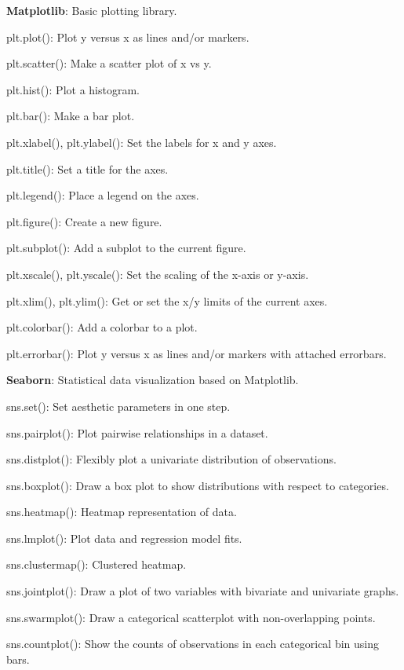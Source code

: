 \begin{DoxyItemize}
\item {\bfseries Matplotlib}\+: Basic plotting library.
\begin{DoxyItemize}
\item {\ttfamily plt.\+plot()}\+: Plot y versus x as lines and/or markers.
\item {\ttfamily plt.\+scatter()}\+: Make a scatter plot of x vs y.
\item {\ttfamily plt.\+hist()}\+: Plot a histogram.
\item {\ttfamily plt.\+bar()}\+: Make a bar plot.
\item {\ttfamily plt.\+xlabel()}, {\ttfamily plt.\+ylabel()}\+: Set the labels for x and y axes.
\item {\ttfamily plt.\+title()}\+: Set a title for the axes.
\item {\ttfamily plt.\+legend()}\+: Place a legend on the axes.
\item {\ttfamily plt.\+figure()}\+: Create a new figure.
\item {\ttfamily plt.\+subplot()}\+: Add a subplot to the current figure.
\item {\ttfamily plt.\+xscale()}, {\ttfamily plt.\+yscale()}\+: Set the scaling of the x-\/axis or y-\/axis.
\item {\ttfamily plt.\+xlim()}, {\ttfamily plt.\+ylim()}\+: Get or set the x/y limits of the current axes.
\item {\ttfamily plt.\+colorbar()}\+: Add a colorbar to a plot.
\item {\ttfamily plt.\+errorbar()}\+: Plot y versus x as lines and/or markers with attached errorbars.
\end{DoxyItemize}
\item {\bfseries Seaborn}\+: Statistical data visualization based on Matplotlib.
\begin{DoxyItemize}
\item {\ttfamily sns.\+set()}\+: Set aesthetic parameters in one step.
\item {\ttfamily sns.\+pairplot()}\+: Plot pairwise relationships in a dataset.
\item {\ttfamily sns.\+distplot()}\+: Flexibly plot a univariate distribution of observations.
\item {\ttfamily sns.\+boxplot()}\+: Draw a box plot to show distributions with respect to categories.
\item {\ttfamily sns.\+heatmap()}\+: Heatmap representation of data.
\item {\ttfamily sns.\+lmplot()}\+: Plot data and regression model fits.
\item {\ttfamily sns.\+clustermap()}\+: Clustered heatmap.
\item {\ttfamily sns.\+jointplot()}\+: Draw a plot of two variables with bivariate and univariate graphs.
\item {\ttfamily sns.\+swarmplot()}\+: Draw a categorical scatterplot with non-\/overlapping points.
\item {\ttfamily sns.\+countplot()}\+: Show the counts of observations in each categorical bin using bars.
\end{DoxyItemize}
\end{DoxyItemize}

